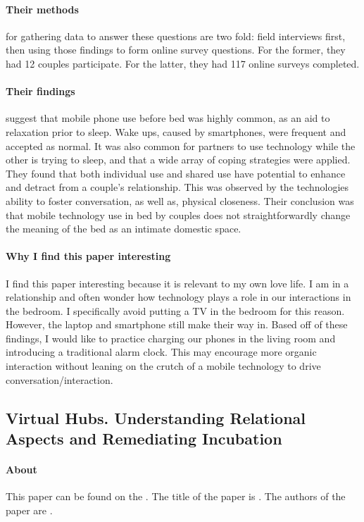 \paragraph{Their methods} for gathering data to answer these questions are two fold: field interviews first, then using those findings to form online survey questions. For the former, they had 12 couples participate. For the latter, they had 117 online surveys completed.

\paragraph{Their findings} suggest that mobile phone use before bed was highly common, as an aid to relaxation prior to sleep. Wake ups, caused by smartphones, were frequent and accepted as normal. It was also common for partners to use technology while the other is trying to sleep, and that a wide array of coping strategies were applied. They found that both individual use and shared use have potential to enhance and detract from a couple's relationship. This was observed by the technologies ability to foster conversation, as well as, physical closeness. Their conclusion was that mobile technology use in bed by couples does not straightforwardly change the meaning of the bed as an intimate domestic space.

\paragraph{Why I find this paper interesting}
I find this paper interesting because it is relevant to my own love life. I am in a relationship and often wonder how technology plays a role in our interactions in the bedroom. I specifically avoid putting a TV in the bedroom for this reason. However, the laptop and smartphone still make their way in. Based off of these findings, I would like to practice charging our phones in the living room and introducing a traditional alarm clock. This may encourage more organic interaction without leaning on the crutch of a mobile technology to drive conversation/interaction.

\subsection{Virtual Hubs. Understanding Relational Aspects and Remediating Incubation}

\paragraph{About}
This paper can be found on the . The title of the paper is . The authors of the paper are .

